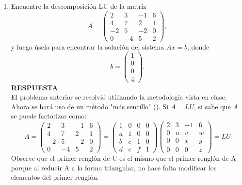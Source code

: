 \documentclass[11pt,letterpaper]{article}
\newcommand{\res}{\textbf{RESPUESTA}\\}
\begin{document}
\begin{enumerate}
\item Encuentre la descomposición LU de la matriz
\begin{equation*}
A=\left(\begin{array}{rrrr}
 2 &  3 & -1 & 6\\
 4 &  7 &  2 & 1\\
-2 &  5 & -2 & 0\\
 0 & -4 &  5 & 2
\end{array} \right),
\end{equation*}
y luego úsela para encontrar la solución del sistema $Ax=b$, donde 
\begin{equation*}
b=\left(\begin{array}{c}
1\\
0\\
0\\
4
\end{array} \right).
\end{equation*}
\res 
El problema anterior se resolvió utilizando la metodología vista en clase. Ahora se hará uso de
un método "más sencillo" (). Si $A =LU$, si sabe que $A$ se puede factorizar como:
\begin{equation*}
A=\left(\begin{array}{rrrr}
 2 &  3 & -1 & 6\\
 4 &  7 &  2 & 1\\
-2 &  5 & -2 & 0\\
 0 & -4 &  5 & 2
\end{array} \right) =
\left(\begin{array}{rrrr}
 1 &  0 &  0 & 0\\
 a &  1 &  0 & 0\\
 b &  c &  1 & 0\\
 d &  e &  f & 1
\end{array} \right) \left(\begin{array}{rrrr}
 2 &  3 & -1 & 6\\
 0 &  u &  v & w\\
 0 &  0 &  x & y\\
 0 &  0 &  0 & z
\end{array} \right)=LU
\end{equation*}
Observe que el primer renglón de U es el mismo que el primer renglón de A porque al reducir A a la forma triangular, no hace falta modificar los elementos del primer renglón.\\

\end{enumerate}
\end{document}
